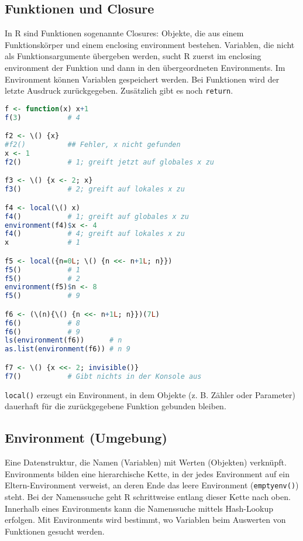 \documentclass[10pt,twocolumn]{scrartcl}
\begin{document}
\subsection{Funktionen und Closure}

In R sind Funktionen sogenannte Closures: Objekte, die aus einem Funktionskörper und einem enclosing environment bestehen.
Variablen, die nicht als Funktionsargumente übergeben werden, sucht R zuerst im enclosing environment der Funktion und dann in den übergeordneten Environments.
Im Environment können Variablen gespeichert werden.
Bei Funktionen wird der letzte Ausdruck zurückgegeben.
Zusätzlich gibt es noch \lstinline|return|.

\begin{lstlisting}[language=R]
f <- function(x) x+1
f(3)           # 4

f2 <- \() {x}
#f2()          ## Fehler, x nicht gefunden
x <- 1
f2()           # 1; greift jetzt auf globales x zu

f3 <- \() {x <- 2; x}
f3()           # 2; greift auf lokales x zu

f4 <- local(\() x)
f4()           # 1; greift auf globales x zu
environment(f4)$x <- 4
f4()           # 4; greift auf lokales x zu
x              # 1

f5 <- local({n=0L; \() {n <<- n+1L; n}})
f5()           # 1
f5()           # 2
environment(f5)$n <- 8
f5()           # 9

f6 <- (\(n){\() {n <<- n+1L; n}})(7L)
f6()           # 8
f6()           # 9
ls(environment(f6))      # n
as.list(environment(f6)) # n 9

f7 <- \() {x <<- 2; invisible()}
f7()           # Gibt nichts in der Konsole aus
\end{lstlisting}

\lstinline|local()| erzeugt ein Environment, in dem Objekte (z. B. Zähler oder Parameter) dauerhaft für die zurückgegebene Funktion gebunden bleiben.

\subsection{Environment (Umgebung)}

Eine Datenstruktur, die Namen (Variablen) mit Werten (Objekten) verknüpft.
Environments bilden eine hierarchische Kette, in der jedes Environment auf ein Eltern-Environment verweist, 
an deren Ende das leere Environment (\lstinline|emptyenv()|) steht.
Bei der Namenssuche geht R schrittweise entlang dieser Kette nach oben.
Innerhalb eines Environments kann die Namenssuche mittels Hash-Lookup erfolgen.
Mit Environments wird bestimmt, wo Variablen beim Auswerten von Funktionen gesucht werden.
\end{document}
